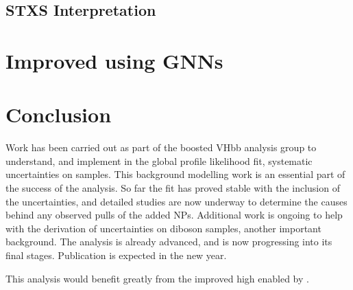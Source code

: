 


\subsection{STXS Interpretation}


\section{Improved \texorpdfstring{\btagging}{b-tagging} using GNNs}


\section{Conclusion}

Work has been carried out as part of the boosted VHbb analysis group to understand, and implement in the global profile likelihood fit, systematic uncertainties on \Vjets samples. This background modelling work is an essential part of the success of the analysis. So far the fit has proved stable with the inclusion of the \Vjets uncertainties, and detailed studies are now underway to determine the causes behind any observed pulls of the added NPs. Additional work is ongoing to help with the derivation of uncertainties on diboson samples, another important background. The analysis is already advanced, and is now progressing into its final stages. Publication is expected in the new year.

This analysis would benefit greatly from the improved high \pt \btagging enabled by \GNN.
